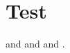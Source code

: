 \documentclass{article}
\begin{document}
\section{Test}\label{sec:test}
 and  and  and .


\end{document}
